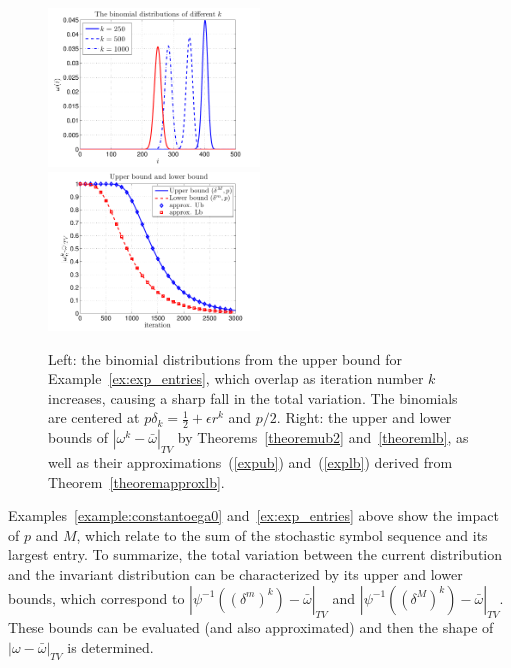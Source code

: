 \documentclass[final]{siamltex}
\begin{document}
\begin{figure}
  \centerline{
    \includegraphics[width=0.5\textwidth,trim=15 0 42 0,clip]{deltaMexample2a}
    \includegraphics[width=0.5\textwidth,trim=15 0 42 0,clip]{deltaMexample2b}
  }
  \caption{\label{deltaMexample2} Left: the binomial distributions
    from the upper bound for Example~\ref{ex:exp_entries}, which
    overlap as iteration number $k$ increases, causing a sharp fall in
    the total variation. The binomials are centered at
    $p\delta_k=\frac{1}{2}+\epsilon r^k$ and $p/2$. Right: the upper
    and lower bounds of $|\omega^k-\bar{\omega}|_{TV}$ by
    Theorems~\ref{theoremub2} and~\ref{theoremlb}, as well as their
    approximations~(\ref{expub}) and~(\ref{explb}) derived from
    Theorem~\ref{theoremapproxlb}.}
\end{figure}

Examples~\ref{example:constantoega0} and~\ref{ex:exp_entries} above
show the impact of $p$ and $M$, which relate to the sum of the
stochastic symbol sequence and its largest entry. To summarize, the
total variation between the current distribution and the invariant
distribution can be characterized by its upper and lower bounds, which
correspond to $|\psi^{-1}( (\delta^m)^k )-\bar{\omega}|_{TV}$ and
$|\psi^{-1}( (\delta^M)^k )-\bar{\omega}|_{TV}$. These bounds can be
evaluated (and also approximated) and then the shape of
$|\omega-\bar{\omega}|_{TV}$ is determined.

\end{document}
